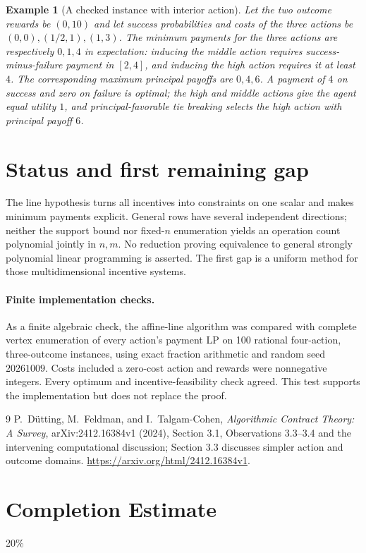 \documentclass[11pt]{article}
\newtheorem{example}[theorem]{Example}
\theoremstyle{definition}
\begin{document}
\begin{example}[A checked instance with interior action]
Let the two outcome rewards be $(0,10)$ and let success probabilities and costs
of the three actions be $(0,0),(1/2,1),(1,3)$.
The minimum payments for the three actions are respectively $0,1,4$ in
expectation: inducing the middle action requires success-minus-failure payment
in $[2,4]$, and inducing the high action requires it at least $4$.
The corresponding maximum principal payoffs are $0,4,6$. A payment of $4$
on success and zero on failure is optimal; the high and middle actions give
the agent equal utility $1$, and principal-favorable tie breaking selects
the high action with principal payoff $6$.
\end{example}

\section{Status and first remaining gap}
The line hypothesis turns all incentives into constraints on one scalar and
makes minimum payments explicit. General rows have several independent
directions; neither the support bound nor fixed-$n$ enumeration yields an
operation count polynomial jointly in $n,m$. No reduction proving equivalence
to general strongly polynomial linear programming is asserted. The first gap
is a uniform method for those multidimensional incentive systems.

\paragraph{Finite implementation checks.}
As a finite algebraic check, the affine-line algorithm was compared with
complete vertex enumeration of every action's payment LP on 100 rational
four-action, three-outcome instances, using exact fraction arithmetic and
random seed $20261009$. Costs included a zero-cost action and rewards were
nonnegative integers. Every optimum and incentive-feasibility check agreed.
This test supports the implementation but does not replace the proof.

\begin{thebibliography}{9}
 P.~D\"utting, M.~Feldman, and I.~Talgam-Cohen,
\emph{Algorithmic Contract Theory: A Survey}, arXiv:2412.16384v1 (2024),
Section 3.1, Observations 3.3--3.4 and the intervening computational discussion;
Section 3.3 discusses simpler action and outcome domains.
\url{https://arxiv.org/html/2412.16384v1}.
\end{thebibliography}

\section{Completion Estimate}
20\%
\end{document}

